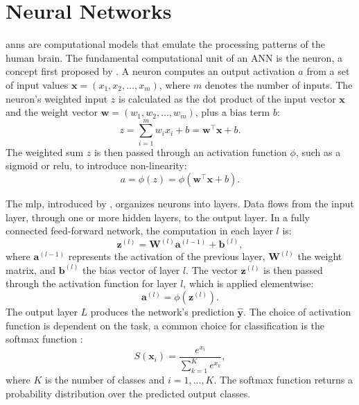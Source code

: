 \documentclass[12pt, a4paper, headinclude, twoside, plainheadsepline, open=right, numbers=noenddot, hidelinks, toc=listof, toc=bibliography]{scrreprt}
\begin{document}
\section{Neural Networks}
\label{sec:nn}

\Acp{ann} are computational models that emulate the processing patterns of the human brain. The fundamental computational unit of an ANN is the neuron, a concept first proposed by \citeauthor{mccullochLogicalCalculusIdeas1943} \cite{mccullochLogicalCalculusIdeas1943}.
A neuron computes an output activation $a$ from a set of input values $\mathbf{x} = (x_1, x_2, \ldots, x_m)$, where $m$ denotes the number of inputs. 
The neuron's weighted input $z$ is calculated as the dot product of the input vector $\mathbf{x}$ and the weight vector $\mathbf{w} = (w_1, w_2, \ldots, w_m)$, plus a bias term $b$:
\begin{equation}
z = \sum_{i=1}^{m} w_i x_i + b = \mathbf{w}^\top \mathbf{x} + b.
\end{equation}
The weighted sum $z$ is then passed through an activation function $\phi$, such as a sigmoid or \ac{relu}, to introduce non-linearity:
\begin{equation}
a = \phi(z) = \phi(\mathbf{w}^\top \mathbf{x} + b).
\end{equation}

The \ac{mlp}, introduced by \citeauthor{rosenblattPerceptronProbabilisticModel1958} \cite{rosenblattPerceptronProbabilisticModel1958}, organizes neurons into layers. 
Data flows from the input layer, through one or more hidden layers, to the output layer. In a fully connected feed-forward network, the computation in each layer $l$ is:
\begin{equation}
\mathbf{z}^{(l)} = \mathbf{W}^{(l)} \mathbf{a}^{(l-1)} + \mathbf{b}^{(l)},
\label{eq:ann_zl}
\end{equation}
where $\mathbf{a}^{(l-1)}$ represents the activation of the previous layer, $\mathbf{W}^{(l)}$ the weight matrix, and $\mathbf{b}^{(l)}$ the bias vector of layer $l$.
The vector $\mathbf{z}^{(l)}$ is then passed through the activation function for layer $l$, which is applied elementwise:
\begin{equation}
\mathbf{a}^{(l)} = \phi (\mathbf{z}^{(l)}).
\label{eq:ann_yhat}
\end{equation}
The output layer $L$ produces the network's prediction $\mathbf{\hat{y}}$.
The choice of activation function is dependent on the task, a common choice for classification is the softmax function \cite{bridleProbabilisticInterpretationFeedforward1990}:
\begin{equation}
\label{eq:softmax}
 S(\mathbf{x}_i) = \frac{e^{x_i}}{\sum_{k=1}^{K} e^{x_k}},
\end{equation}
where $K$ is the number of classes and $i = 1, ..., K$.
The softmax function returns a probability distribution over the predicted output classes.
\end{document}
